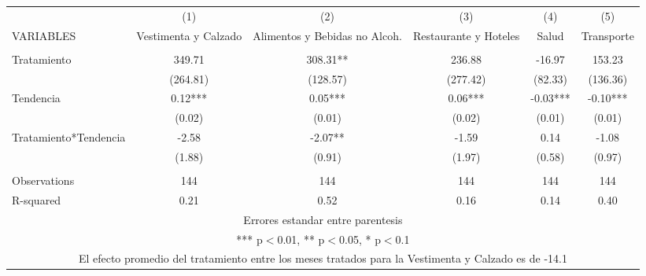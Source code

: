 \documentclass[]{article}
\begin{document}
\begin{tabular}{lccccc} \hline
 & (1) & (2) & (3) & (4) & (5) \\
VARIABLES & Vestimenta y Calzado & Alimentos y Bebidas no Alcoh. & Restaurante y Hoteles & Salud & Transporte \\ \hline
 &  &  &  &  &  \\
Tratamiento & 349.71 & 308.31** & 236.88 & -16.97 & 153.23 \\
 & (264.81) & (128.57) & (277.42) & (82.33) & (136.36) \\
Tendencia & 0.12*** & 0.05*** & 0.06*** & -0.03*** & -0.10*** \\
 & (0.02) & (0.01) & (0.02) & (0.01) & (0.01) \\
Tratamiento*Tendencia & -2.58 & -2.07** & -1.59 & 0.14 & -1.08 \\
 & (1.88) & (0.91) & (1.97) & (0.58) & (0.97) \\
 &  &  &  &  &  \\
Observations & 144 & 144 & 144 & 144 & 144 \\
 R-squared & 0.21 & 0.52 & 0.16 & 0.14 & 0.40 \\ \hline
\multicolumn{6}{c}{ Errores estandar entre parentesis} \\
\multicolumn{6}{c}{ *** p$<$0.01, ** p$<$0.05, * p$<$0.1} \\
\multicolumn{6}{c}{ El efecto promedio del tratamiento entre los meses tratados para la Vestimenta y Calzado es de -14.1} \\
\end{tabular}
\end{document}
